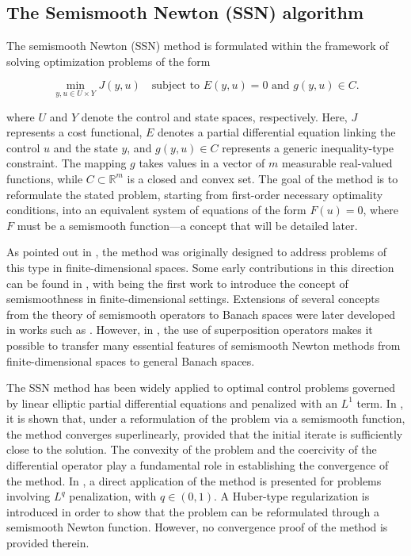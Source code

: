 \subsection{The Semismooth Newton (SSN) algorithm}

The semismooth Newton (SSN) method is formulated within the framework of solving optimization problems 
of the form

\begin{equation}
\min_{y,u\in U\times Y} J(y,u)
\quad \text{subject to } E(y,u)=0 \text{ and } g(y,u) \in C.
\end{equation}


where $U$ and $Y$ denote the control and state spaces, respectively. Here, $J$ represents a cost functional, 
$E$ denotes a partial differential equation linking the control $u$ and the state $y$, and $g(y,u)\in C$ 
represents a generic inequality-type constraint. The mapping $g$ takes values in a vector of $m$ measurable 
real-valued functions, while $C\subset \mathbb{R}^{m}$ is a closed and convex set.
The goal of the method is to reformulate the stated problem, starting from first-order necessary optimality 
conditions, into an equivalent system of equations of the form $F(u)=0$, where $F$ must be a semismooth 
function—a concept that will be detailed later.

As pointed out in \cite{ulbrich}, the method was originally designed to address problems of this type in 
finite-dimensional spaces. Some early contributions in this direction can be found in \cite{mifflin, qi, pang}, 
with \cite{mifflin} being the first work to introduce the concept of semismoothness in finite-dimensional 
settings. Extensions of several concepts from the theory of semismooth operators to Banach spaces were later 
developed in works such as \cite{kummer, robinson, chen}. However, in \cite{ulbrich}, the use of superposition 
operators makes it possible to transfer many essential features of semismooth Newton methods from 
finite-dimensional spaces to general Banach spaces.

The SSN method has been widely applied to optimal control problems governed by linear elliptic partial 
differential equations and penalized with an $L^1$ term. In \cite{stadler}, it is shown that, under a 
reformulation of the problem via a semismooth function, the method converges superlinearly, provided that 
the initial iterate is sufficiently close to the solution. The convexity of the problem and the coercivity 
of the differential operator play a fundamental role in establishing the convergence of the method. 
In \cite{merino2021}, a direct application of the method is presented for problems involving $L^q$
 penalization, with $q\in (0,1)$. A Huber-type regularization is introduced in order to show that the 
 problem can be reformulated through a semismooth Newton function. However, no convergence proof of the 
 method is provided therein.

